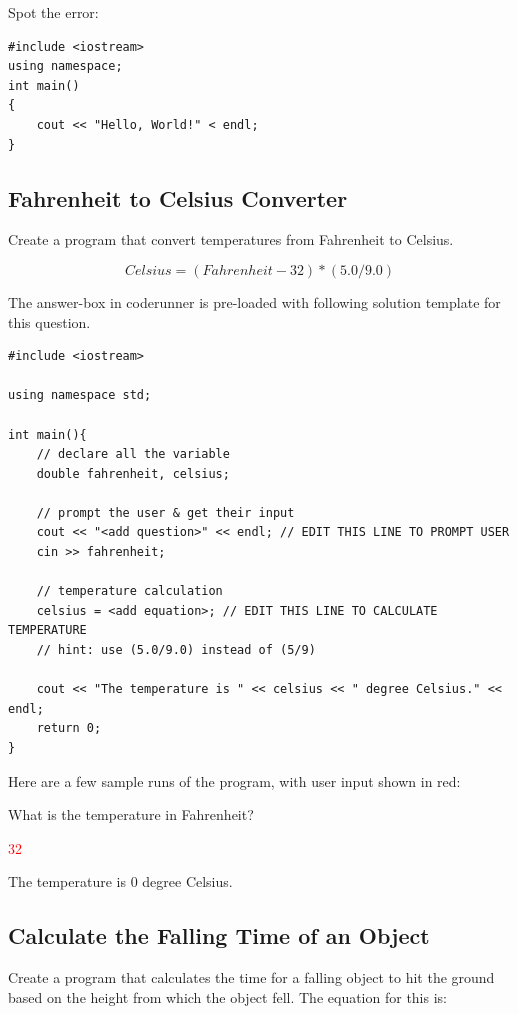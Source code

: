 \begin{multipart}
Spot the error:

    \begin{verbatim}
#include <iostream> 
using namespace;
int main() 
{
    cout << "Hello, World!" < endl; 
}
    \end{verbatim}
\end{multipart}

\subsection{Fahrenheit to Celsius Converter}

Create a program that convert temperatures from Fahrenheit to Celsius.

$$Celsius = (Fahrenheit - 32) * (5.0 / 9.0)$$

The answer-box in coderunner is pre-loaded with following solution template for this question.

\begin{verbatim}
#include <iostream>

using namespace std;

int main(){
    // declare all the variable
    double fahrenheit, celsius;

    // prompt the user & get their input
    cout << "<add question>" << endl; // EDIT THIS LINE TO PROMPT USER
    cin >> fahrenheit;

    // temperature calculation
    celsius = <add equation>; // EDIT THIS LINE TO CALCULATE TEMPERATURE
    // hint: use (5.0/9.0) instead of (5/9)

    cout << "The temperature is " << celsius << " degree Celsius." << endl;
    return 0;
}
\end{verbatim}

Here are a few sample runs of the program, with user input shown in red:

\begin{sample}
What is the temperature in Fahrenheit? 

\textcolor{red}{32}

The temperature is 0 degree Celsius.
\end{sample}

\subsection{Calculate the Falling Time of an Object}

Create a program that calculates the time for a falling object to hit the ground based on the height from which the object fell. The equation for this is:

